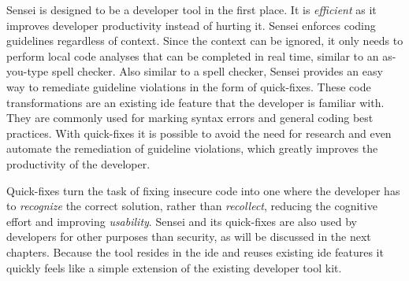 Sensei is designed to be a developer tool in the first place.
It is \textit{efficient} as it improves developer productivity instead of hurting it.
Sensei enforces coding guidelines regardless of context.
Since the context can be ignored, it only needs to perform local code analyses that can be completed in real time, similar to an as-you-type spell checker.
Also similar to a spell checker, Sensei provides an easy way to remediate guideline violations in the form of quick-fixes.
These code transformations are an existing \gls{ide} feature that the developer is familiar with.
They are commonly used for marking syntax errors and general coding best practices.
With quick-fixes it is possible to avoid the need for research and even automate the remediation of guideline violations, which greatly improves the productivity of the developer.

Quick-fixes turn the task of fixing insecure code into one where the developer has to \textit{recognize} the correct solution, rather than \textit{recollect}, reducing the cognitive effort and improving \textit{usability}.
Sensei and its quick-fixes are also used by developers for other purposes than security, as will be discussed in the next chapters.
Because the tool resides in the \gls{ide} and reuses existing \gls{ide} features it quickly feels like a simple extension of the existing developer tool kit.